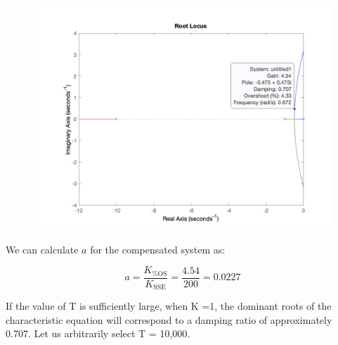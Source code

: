 \documentclass[12pt, letterpaper]{../assignment}
\begin{document}
\begin{figure}[H]
    \centering
    \includegraphics[width=1\linewidth]{./figures/rlocus_9_49a.png}
\end{figure}

We can calculate $a$ for the compensated system as:

$$ a = \frac{K_\text{\%OS}}{K_\text{SSE}} = \frac{4.54}{200} = 0.0227 $$

If the value of T is sufficiently large, when K =1,
the dominant roots of the characteristic equation will correspond to a damping ratio of approximately 0.707.
Let us arbitrarily select T = 10,000.






\end{document}

